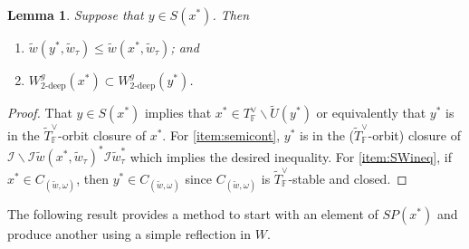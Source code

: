 \documentclass[oneside,a4paper,english, 11pt]{amsart}
\theoremstyle{plain}
\theoremstyle{plain}
\theoremstyle{plain}
\newtheorem{lemma}[thm]{Lemma}
\theoremstyle{plain}
\theoremstyle{plain}
\theoremstyle{plain}
\theoremstyle{definition}
\theoremstyle{definition}
\theoremstyle{definition}
\theoremstyle{remark}
\numberwithin{equation}{section}
\newcommand{\F}{\mathbb{F}}
\newcommand{\cI}{\mathcal{I}}
\newcommand{\tld}[1]{\widetilde{#1}}
\begin{document}
\begin{lemma} \label{lemma:semicont}
Suppose that $y \in S(x^*)$. 
Then 
\begin{enumerate}
\item \label{item:semicont} $\tld{w}(y^*,\tld{w}_\tau) \leq \tld{w}(x^*,\tld{w}_\tau)$; and
\item \label{item:SWineq} $W^g_{2\textrm{-deep}}(x^*) \subset W^g_{2\textrm{-deep}}(y^*)$. 
\end{enumerate}
\end{lemma}
\begin{proof}

That $y \in S(x^*)$ implies that $x^* \in T_{\F}^{\vee}\backslash\tld{U}(y^*)$ or equivalently that $y^*$ is in the $\tld{T}_{\F}^{\vee}$-orbit closure of $x^*$. 
For \eqref{item:semicont}, $y^*$ is in the ($\tld{T}_{\F}^{\vee}$-orbit) closure of $\cI\backslash \cI \tld{w}(x^*,\tld{w}_\tau)^* \cI \tld{w}_\tau^*$ which implies the desired inequality. 
For \eqref{item:SWineq}, if $x^* \in C_{(\tld{w},\omega)}$, then $y^* \in C_{(\tld{w},\omega)}$ since $C_{(\tld{w},\omega)}$ is $\tld{T}_{\F}^{\vee}$-stable and closed. 
%
\end{proof}

The following result provides a method to start with an element of $SP(x^*)$ and produce another using a simple reflection in $W$. 
\end{document}
